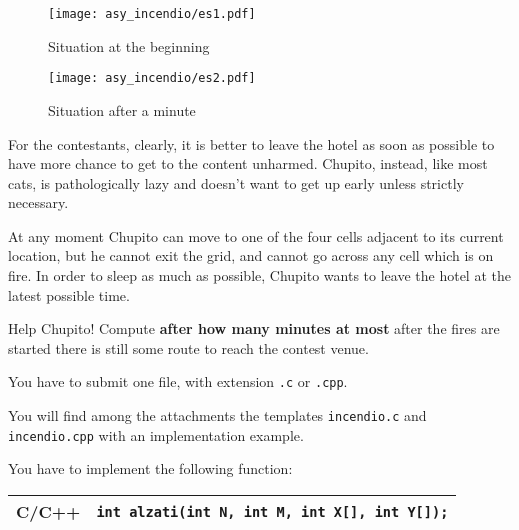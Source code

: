 \begin{figure}[h]
    \begin{center}
  \begin{minipage}{0.45\linewidth}
    \texttt{[image: asy\_incendio/es1.pdf]}
    \caption*{Situation at the beginning}
  \end{minipage}
  \hspace{0.05\linewidth}
  \begin{minipage}{0.45\linewidth}
    \texttt{[image: asy\_incendio/es2.pdf]}
    \caption*{Situation after a minute}
  \end{minipage}
  \end{center}
\end{figure}

For the contestants, clearly, it is better to leave the hotel as soon as possible
to have more chance to get to the content unharmed. Chupito, instead, like most
cats, is pathologically lazy and doesn't want to get up early unless strictly
necessary.

At any moment Chupito can move to one of the four cells adjacent to its current
location, but he cannot exit the grid, and cannot go across any cell which is on
fire. In order to sleep as much as possible, Chupito wants to leave the hotel at
the latest possible time.

Help Chupito! Compute \textbf{after how many minutes at most} after the fires
are started there is still some route to reach the contest venue.


\pagebreak
\Implementation

You have to submit one file, with extension \texttt{.c} or \texttt{.cpp}.

\begin{warning}
	You will find among the attachments the templates \texttt{incendio.c} and \texttt{incendio.cpp} with an implementation example.
\end{warning}

You have to implement the following function:

\begin{center}\begin{tabularx}{\textwidth}{|c|X|}
\hline
C/C++  & \verb|int alzati(int N, int M, int X[], int Y[]);|\\
\hline
\end{tabularx}\end{center}

